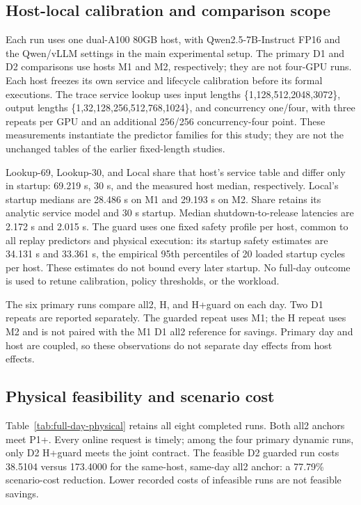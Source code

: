 \subsection{Host-local calibration and comparison scope}
Each run uses one dual-A100 80GB host, with Qwen2.5-7B-Instruct FP16 and
the Qwen/vLLM settings in the main experimental setup. The primary D1 and D2
comparisons use hosts M1 and M2, respectively; they are not four-GPU runs.
Each host freezes its own service and lifecycle calibration before its
formal executions. The trace service lookup uses input lengths
\{1,128,512,2048,3072\}, output lengths
\{1,32,128,256,512,768,1024\}, and concurrency one/four, with three repeats
per GPU and an additional 256/256 concurrency-four point.
These measurements instantiate the predictor families for this study;
they are not the unchanged tables of the earlier fixed-length studies.

Lookup-69, Lookup-30, and Local share that host's service table and differ
only in startup: 69.219 s, 30 s, and the measured host median, respectively.
Local's startup medians are 28.486 s on M1 and 29.193 s on M2.
Share retains its analytic service model and 30 s startup.
Median shutdown-to-release latencies are 2.172 s and 2.015 s.
The guard uses one fixed safety profile per host, common to all replay
predictors and physical execution: its startup safety estimates are
34.131 s and 33.361 s, the empirical 95th percentiles of 20 loaded
startup cycles per host. These estimates do not bound every later startup.
No full-day outcome is used to retune calibration, policy thresholds,
or the workload.

The six primary runs compare all2, H, and H+guard
on each day. Two D1 repeats are reported separately. The guarded repeat
uses M1; the H repeat uses M2 and is not paired with the M1 D1 all2 reference
for savings. Primary day and host are coupled, so these observations do not
separate day effects from host effects.

\subsection{Physical feasibility and scenario cost}
Table~\ref{tab:full-day-physical} retains all eight completed runs.
Both all2 anchors meet P1+. Every online request is timely;
among the four primary dynamic runs, only D2 H+guard meets the joint contract.
The feasible D2 guarded run costs 38.5104 versus 173.4000 for the same-host,
same-day all2 anchor: a 77.79\% scenario-cost reduction.
Lower recorded costs of infeasible runs are not feasible savings.


